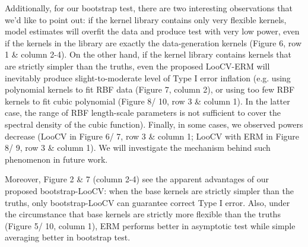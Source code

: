 \documentclass[article]{jss}
\begin{document}
Additionally, for our bootstrap test, there are two interesting observations that we'd like to point out: if the kernel library contains only very flexible kernels, model estimates will overfit the data and produce test with very low power, even if the kernels in the library are exactly the data-generation kernels (Figure 6, row 1 \& column 2-4). On the other hand, if the kernel library contains kernels that are strictly simpler than the truths, even the proposed LooCV-ERM will inevitably produce slight-to-moderate level of Type I error inflation (e.g. using polynomial kernels to fit RBF data (Figure 7, column 2), or using too few RBF kernels to fit cubic polynomial (Figure 8/ 10, row 3 \& column 1). In the latter case, the range of RBF length-scale parameters is not sufficient to cover the spectral density of the cubic function). Finally, in some cases, we observed powers decrease (LooCV in Figure 6/ 7, row 3 \& column 1; LooCV with ERM in Figure 8/ 9, row 3 \& column 1). We will investigate the mechanism behind such phenomenon in future work.

Moreover, Figure 2 \& 7 (column 2-4) see the apparent advantages of our proposed bootstrap-LooCV: when the base kernels are strictly simpler than the truths, only bootstrap-LooCV can guarantee correct Type I error. Also, under the circumstance that base kernels are strictly more flexible than the truths (Figure 5/ 10, column 1), ERM performs better in asymptotic test while simple averaging better in bootstrap test.
\end{document}
